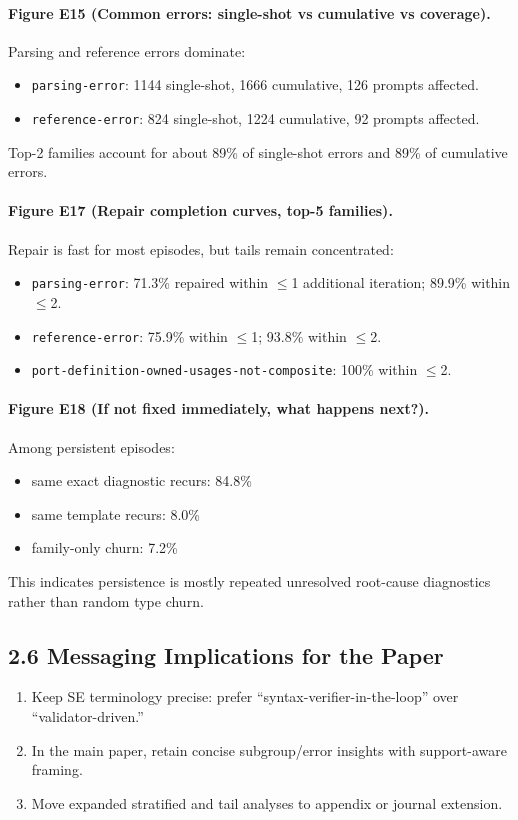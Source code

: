 \documentclass[11pt]{article}
\begin{document}
\paragraph{Figure E15 (Common errors: single-shot vs cumulative vs coverage).}
Parsing and reference errors dominate:
\begin{itemize}
    \item \texttt{parsing-error}: 1144 single-shot, 1666 cumulative, 126 prompts affected.
    \item \texttt{reference-error}: 824 single-shot, 1224 cumulative, 92 prompts affected.
\end{itemize}
Top-2 families account for about 89\% of single-shot errors and 89\% of cumulative errors.

\paragraph{Figure E17 (Repair completion curves, top-5 families).}
Repair is fast for most episodes, but tails remain concentrated:
\begin{itemize}
    \item \texttt{parsing-error}: 71.3\% repaired within \(\leq\)1 additional iteration; 89.9\% within \(\leq\)2.
    \item \texttt{reference-error}: 75.9\% within \(\leq\)1; 93.8\% within \(\leq\)2.
    \item \texttt{port-definition-owned-usages-not-composite}: 100\% within \(\leq\)2.
\end{itemize}

\paragraph{Figure E18 (If not fixed immediately, what happens next?).}
Among persistent episodes:
\begin{itemize}
    \item same exact diagnostic recurs: 84.8\%
    \item same template recurs: 8.0\%
    \item family-only churn: 7.2\%
\end{itemize}
This indicates persistence is mostly repeated unresolved root-cause diagnostics rather than random type churn.

\subsection*{2.6 Messaging Implications for the Paper}
\begin{enumerate}
    \item Keep SE terminology precise: prefer ``syntax-verifier-in-the-loop'' over ``validator-driven.''
    \item In the main paper, retain concise subgroup/error insights with support-aware framing.
    \item Move expanded stratified and tail analyses to appendix or journal extension.
\end{enumerate}
\end{document}
